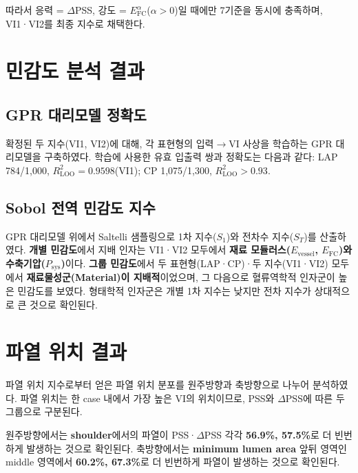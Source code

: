 \documentclass[master,english,final]{kaist-ucs}
\begin{document}
따라서 응력 = $\Delta$PSS, 강도 = $E_\mathrm{FC}^{\alpha}$($\alpha > 0$)일 때에만 7기준을 동시에 충족하며, VI1·VI2를 최종 지수로 채택한다.

\section{민감도 분석 결과}

\subsection{GPR 대리모델 정확도}

확정된 두 지수(VI1, VI2)에 대해, 각 표현형의 입력$\to$VI 사상을 학습하는 GPR 대리모델을 구축하였다. 학습에 사용한 유효 입출력 쌍과 정확도는 다음과 같다: LAP 784/1{,}000, $R^2_\mathrm{LOO}=0.9598$(VI1); CP 1{,}075/1{,}300, $R^2_\mathrm{LOO}>0.93$.

\subsection{Sobol 전역 민감도 지수}


GPR 대리모델 위에서 Saltelli 샘플링으로 1차 지수($S_1$)와 전차수 지수($S_T$)를 산출하였다. \textbf{개별 민감도}에서 지배 인자는 VI1·VI2 모두에서 \textbf{재료 모듈러스($E_\mathrm{vessel}$, $E_\mathrm{FC}$)와 수축기압($P_\mathrm{sys}$)}이다. \textbf{그룹 민감도}에서 두 표현형(LAP·CP)·두 지수(VI1·VI2) 모두에서 \textbf{재료물성군(Material)이 지배적}이었으며, 그 다음으로 혈류역학적 인자군이 높은 민감도를 보였다. 형태학적 인자군은 개별 1차 지수는 낮지만 전차 지수가 상대적으로 큰 것으로 확인된다.

\section{파열 위치 결과}


파열 위치 지수로부터 얻은 파열 위치 분포를 원주방향과 축방향으로 나누어 분석하였다. 파열 위치는 한 case 내에서 가장 높은 VI의 위치이므로, PSS와 $\Delta$PSS에 따른 두 그룹으로 구분된다.

원주방향에서는 \textbf{shoulder}에서의 파열이 PSS·$\Delta$PSS 각각 \textbf{56.9\%, 57.5\%}로 더 빈번하게 발생하는 것으로 확인된다. 축방향에서는 \textbf{minimum lumen area} 앞뒤 영역인 middle 영역에서 \textbf{60.2\%, 67.3\%}로 더 빈번하게 파열이 발생하는 것으로 확인된다.
\end{document}
